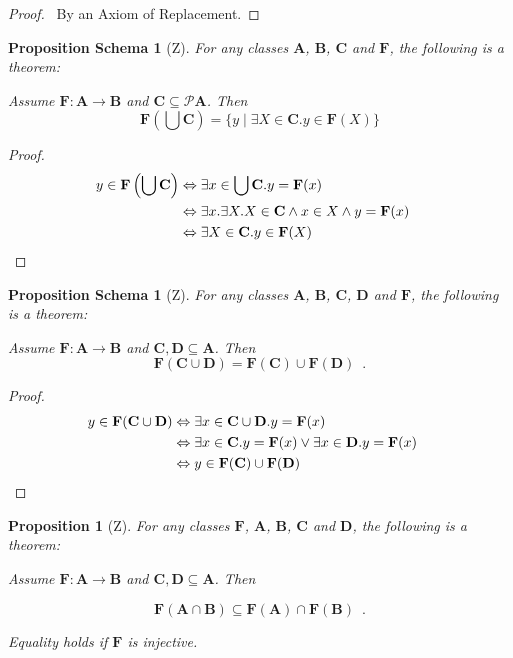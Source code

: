 \documentclass{book}
\let\qed\relax
\newtheorem{prop}[ax]{Proposition}
\newtheorem{props}[ax]{Proposition Schema}
\theoremstyle{definition}
\begin{document}
\begin{proof}
\pf\ By an Axiom of Replacement. \qed
\end{proof}

\begin{props}[Z]
\label{prop:imgunion}
For any classes $\mathbf{A}$, $\mathbf{B}$, $\mathbf{C}$ and $\mathbf{F}$, the following is a theorem:

Assume $\mathbf{F} : \mathbf{A} \rightarrow \mathbf{B}$ and $\mathbf{C} \subseteq \mathcal{P} \mathbf{A}$. Then
\[ \mathbf{F} \left( \bigcup \mathbf{C} \right) = \{ y \mid \exists X \in \mathbf{C}. y \in \mathbf{F}(X) \} \]
\end{props}

\begin{proof}
\pf
\begin{align*}
	y \in \mathbf{F} \left( \bigcup \mathbf{C} \right) & \Leftrightarrow \exists x \in \bigcup \mathbf{C}. y = \mathbf{F}(x) \\
	& \Leftrightarrow \exists x. \exists X. X \in \mathbf{C} \wedge x \in X \wedge y = \mathbf{F}(x) \\
	& \Leftrightarrow \exists X \in \mathbf{C}. y \in \mathbf{F}(X) & \qed
\end{align*}
\end{proof}

\begin{props}[Z]
For any classes $\mathbf{A}$, $\mathbf{B}$, $\mathbf{C}$, $\mathbf{D}$ and $\mathbf{F}$, the following is a theorem:

Assume $\mathbf{F} : \mathbf{A} \rightarrow \mathbf{B}$ and $\mathbf{C}, \mathbf{D} \subseteq \mathbf{A}$. Then
\[ \mathbf{F}(\mathbf{C} \cup \mathbf{D}) = \mathbf{F}(\mathbf{C}) \cup \mathbf{F}(\mathbf{D}) \enspace . \]
\end{props}

\begin{proof}
\pf
\begin{align*}
	y \in \mathbf{F}(\mathbf{C} \cup \mathbf{D})
	& \Leftrightarrow \exists x \in \mathbf{C} \cup \mathbf{D}. y = \mathbf{F}(x) \\
	& \Leftrightarrow \exists x \in \mathbf{C}. y = \mathbf{F}(x) \vee \exists x \in \mathbf{D}. y = \mathbf{F}(x) \\
	& \Leftrightarrow y \in \mathbf{F}(\mathbf{C}) \cup \mathbf{F}(\mathbf{D}) & \qed
\end{align*}
\end{proof}

\begin{prop}[Z]
For any classes $\mathbf{F}$, $\mathbf{A}$, $\mathbf{B}$, $\mathbf{C}$ and $\mathbf{D}$, the following is a theorem:

Assume $\mathbf{F} : \mathbf{A} \rightarrow \mathbf{B}$ and $\mathbf{C}, \mathbf{D} \subseteq \mathbf{A}$. Then

\[ \mathbf{F}(\mathbf{A} \cap \mathbf{B}) \subseteq \mathbf{F}(\mathbf{A}) \cap \mathbf{F}(\mathbf{B}) \enspace . \]

Equality holds if $\mathbf{F}$ is injective.
\end{prop}
\end{document}
